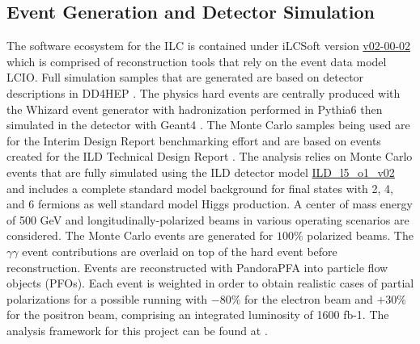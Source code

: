 

\subsection{Event Generation and Detector Simulation}
\label{ild}

The software ecosystem for the ILC is contained under iLCSoft \cite{ilcsoft} version \url{v02-00-02} which is comprised of reconstruction tools that rely on the event data model LCIO\cite{lcio}. Full simulation samples that are generated are based on detector descriptions in DD4HEP \cite{dd4hep}. The physics hard events are centrally produced with the Whizard event generator \cite{ whizard} with hadronization performed in Pythia6 \cite{pythia} then simulated in the detector with Geant4 \cite{geant4}. The Monte Carlo samples being used are for the Interim Design Report benchmarking effort \cite{ILDIDR} and are based on events created for the ILD Technical Design Report \cite{tdrdet}. The analysis relies on Monte Carlo events that are fully simulated using the ILD detector model \url{ ILD_l5_o1_v02 } and includes a complete standard model background for final states with 2, 4, and 6 fermions as well standard model Higgs production.  A center of mass energy of 500 GeV and longitudinally-polarized beams in various operating scenarios are considered. The Monte Carlo events are generated for $100\%$ polarized beams. The $\gamma \gamma$ event contributions are overlaid on top of the hard event before reconstruction. Events are reconstructed with PandoraPFA \cite{pandora} into particle flow objects (PFOs). Each event is weighted in order to obtain realistic cases of partial polarizations for a possible running with $-80\%$ for the electron beam and $+30\%$ for the positron beam, comprising an integrated luminosity of 1600 fb-1.  The analysis framework for this project can be found at \cite{wwrepo}. 



